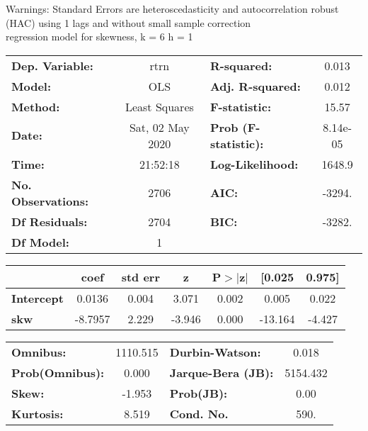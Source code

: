 Warnings: \newline
 [1] Standard Errors are heteroscedasticity and autocorrelation robust (HAC) using 1 lags and without small sample correction\\ 

regression model for skewness, k = 6 h = 1\begin{center}
\begin{tabular}{lclc}
\toprule
\textbf{Dep. Variable:}    &       rtrn       & \textbf{  R-squared:         } &     0.013   \\
\textbf{Model:}            &       OLS        & \textbf{  Adj. R-squared:    } &     0.012   \\
\textbf{Method:}           &  Least Squares   & \textbf{  F-statistic:       } &     15.57   \\
\textbf{Date:}             & Sat, 02 May 2020 & \textbf{  Prob (F-statistic):} &  8.14e-05   \\
\textbf{Time:}             &     21:52:18     & \textbf{  Log-Likelihood:    } &    1648.9   \\
\textbf{No. Observations:} &        2706      & \textbf{  AIC:               } &    -3294.   \\
\textbf{Df Residuals:}     &        2704      & \textbf{  BIC:               } &    -3282.   \\
\textbf{Df Model:}         &           1      & \textbf{                     } &             \\
\bottomrule
\end{tabular}
\begin{tabular}{lcccccc}
                   & \textbf{coef} & \textbf{std err} & \textbf{z} & \textbf{P$> |$z$|$} & \textbf{[0.025} & \textbf{0.975]}  \\
\midrule
\textbf{Intercept} &       0.0136  &        0.004     &     3.071  &         0.002        &        0.005    &        0.022     \\
\textbf{skw}       &      -8.7957  &        2.229     &    -3.946  &         0.000        &      -13.164    &       -4.427     \\
\bottomrule
\end{tabular}
\begin{tabular}{lclc}
\textbf{Omnibus:}       & 1110.515 & \textbf{  Durbin-Watson:     } &    0.018  \\
\textbf{Prob(Omnibus):} &   0.000  & \textbf{  Jarque-Bera (JB):  } & 5154.432  \\
\textbf{Skew:}          &  -1.953  & \textbf{  Prob(JB):          } &     0.00  \\
\textbf{Kurtosis:}      &   8.519  & \textbf{  Cond. No.          } &     590.  \\
\bottomrule
\end{tabular}
\end{center}

